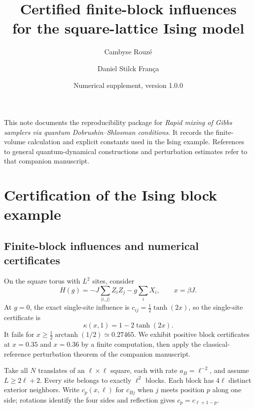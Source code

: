 \documentclass[11pt,a4paper]{article}
\title{Certified finite-block influences\\for the square-lattice Ising model}
\author{Cambyse Rouz\'e \and Daniel Stilck Fran\c{c}a}
\date{Numerical supplement, version 1.0.0}
\theoremstyle{remark}
\begin{document}
\maketitle
\noindent This note documents the reproducibility package for
\emph{Rapid mixing of Gibbs samplers via quantum Dobrushin--Shlosman conditions}.
It records the finite-volume calculation and explicit constants used in the
Ising example. References to general quantum-dynamical constructions and
perturbation estimates refer to that companion manuscript.
\section{Certification of the Ising block example}
\label{app:ising-certification}

\subsection{Finite-block influences and numerical certificates}
\label{app:ising-blocks}

On the square torus with $L^2$ sites, consider
\begin{equation}
 H(g)=-J\sum_{\langle i,j\rangle}Z_iZ_j-g\sum_iX_i,
 \qquad x=\beta J.
 \label{qp:ising-model}
\end{equation}
At $g=0$, the exact single-site influence is
$c_{ij}=\frac12\tanh(2x)$, so the single-site certificate is
\begin{equation}
 \kappa(x,1)=1-2\tanh(2x).
 \label{qp:ising-singleton}
\end{equation}
It fails for $x\ge\frac12\operatorname{arctanh}(1/2)\simeq0.27465$.
We exhibit positive block certificates at $x=0.35$ and $x=0.36$ by
a finite computation, then apply the classical-reference perturbation theorem of the companion manuscript.

Take all $N$ translates of an $\ell\times\ell$ square, each with
rate $a_B=\ell^{-2}$, and assume $L\ge2\ell+2$.
Every site belongs to exactly $\ell^2$ blocks. Each block has
$4\ell$ distinct exterior neighbors. Write $c_p(x,\ell)$ for
$c_{Bj}$ when $j$ meets position $p$ along one side;
rotations identify the four sides and reflection gives
$c_p=c_{\ell+1-p}$.
\end{document}
